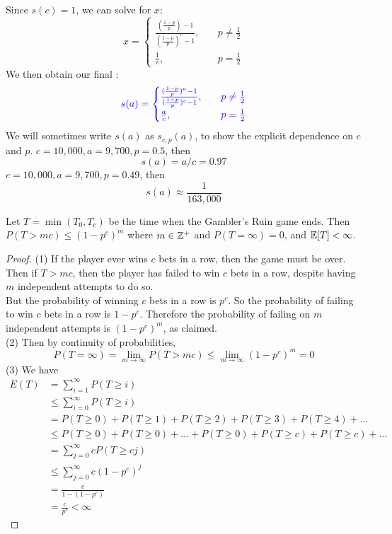 \documentclass[11pt]{article}
\renewcommand{\limit}[1]{\underset{{#1} \rightarrow \infty}{\lim}}
\begin{document}
    Since $s(c) = 1$, we can solve for $x$:
    $$x = \begin{cases}
   	\frac{(\frac{1-p}{p}) - 1}{(\frac{1-p}{p})^c - 1}, \quad &p \neq \frac{1}{2}\\
   	\frac{1}{c}, \quad &p=\frac{1}{2}
    \end{cases}$$
	We then obtain our final :
	$$\textcolor{blue}{s(a) = \begin{cases}
    		\frac{(\frac{1-p}{p})^a - 1}{(\frac{1-p}{p})^c - 1} , \quad &p \neq \frac{1}{2} \\
    		\frac{a}{c}, \quad & p = \frac{1}{2}
    		\end{cases}}$$
    \remark
    We will sometimes write $s(a)$ as $s_{c,p}(a)$, to show the explicit dependence on $c$ and $p$.
    \example
    $c = 10,000, a = 9,700, p = 0.5$, then
    $$s(a) = a/c = 0.97$$
    \example
    $c = 10,000, a = 9,700, p = 0.49$, then
    $$s(a) \approx \frac{1}{163,000}$$
    
    \proposition[\label{gb}] Let $T = \min(T_0, T_c)$ be the time when the Gambler's Ruin game ends. Then $P(T > mc) \leq (1-p^c)^m$ where $m \in \mathbb{Z}^+$ and $P(T = \infty) = 0$, and $\mathbb{E}[{T}] < \infty$.
    \begin{proof}
    	(1) If the player ever wins $c$ bets in a row, then the game must be over. \\
    	Then if $T > mc$, then the player has failed to win $c$ bets in a row, despite having $m$ independent attempts to do so.\\
    	But the probability of winning $c$ bets in a row is $p^c$. So the probability of failing to win $c$ bets in a row is $1 - p^c$. Therefore the probability of failing on $m$ independent attempts is $(1-p^c)^m$, as claimed. \\
    	(2) Then by continuity of probabilities,
    	$$P(T = \infty) = \limit{m} P(T>mc) \leq \limit{m}(1-p^c)^m = 0$$
    	(3) We have
    	\begin{align*}
    		E(T) &= \sum_{i=1}^\infty P(T \geq i)\\
    		&\leq \sum_{i=0}^\infty P(T \geq i)\\
    		&= P(T \geq 0) + P(T \geq 1) + P(T \geq 2) + P(T \geq 3) + P(T \geq 4) + \hdots \\
    		&\leq P(T \geq 0) + P(T \geq 0) + \hdots + P(T \geq 0) + P(T \geq c) + P(T \geq c) + \hdots\\
    		&= \sum_{j=0}^\infty c P(T \geq cj) \\
    		&\leq \sum_{j=0}^\infty c(1-p^c)^j \\
    		&= \frac{c}{1-(1-p^c)} \\
    		&= \frac{c}{p^c} < \infty
    	\end{align*}
    \end{proof}
    
\end{document}
